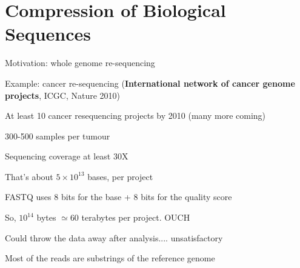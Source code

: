 \documentclass{beamer}
\begin{document}
\section{Compression of Biological Sequences}


\begin{frame}{Motivation: whole genome re-sequencing}

\itemb
\item Example: \alert{cancer re-sequencing} ({\bf International network of cancer genome projects}, ICGC, Nature 2010)
 \itemb
 \item At least 10 cancer resequencing projects by 2010 (many more coming)
 \item 300-500 samples per tumour
 \item Sequencing coverage at least 30X
 \item That's about $5 \times 10^{13}$ bases, per project
 \item FASTQ uses 8 bits for the base + 8 bits for the \alert{quality score}
 \item So, $10^{14}$ bytes $\simeq 60$ terabytes per project. OUCH
 \iteme
\item Could throw the data away after analysis.... unsatisfactory
\item \alert{Most of the reads are substrings of the reference genome}
\iteme

\end{frame}
\end{document}
